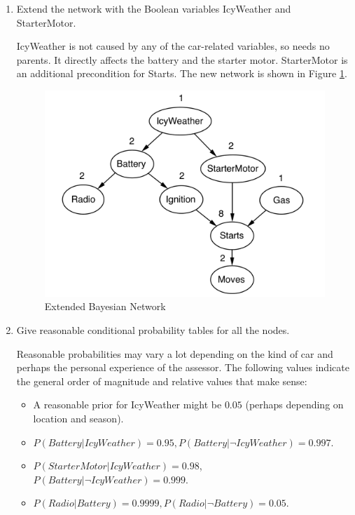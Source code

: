 \documentclass[9pt,a4paper]{extarticle}
\newenvironment{solution}
    {%
    \color{red}
    }
    { 
    \color{black}
    }
\begin{document}
\begin{enumerate}
    \item Extend the network with the Boolean variables IcyWeather and StarterMotor.
    \begin{solution}
    IcyWeather is not caused by any of the car-related variables, so needs no parents. It directly affects the battery and the starter motor. StarterMotor is an additional precondition for Starts. The new network is shown in Figure \ref{fig:ext_car_bnet}.
    \begin{figure}[h]
        \centering
        \includegraphics[width=.9\textwidth]{figures/car_bnet_full.png}
        \caption{Extended Bayesian Network}
        \label{fig:ext_car_bnet}
    \end{figure}
    \end{solution}
    \item Give reasonable conditional probability tables for all the nodes.
    \begin{solution}
    Reasonable probabilities may vary a lot depending on the kind of car and perhaps the personal experience of the assessor. The following values indicate the general order of magnitude and relative values that make sense:
    \begin{itemize}
        \item  A reasonable prior for IcyWeather might be $0.05$ (perhaps depending on location and season).
        \item   $P(Battery|IcyWeather)=0.95,P(Battery|\lnot IcyWeather)=0.997$.
        \item   $P(StarterMotor|IcyWeather) = 0.98$, $P(Battery|\lnot IcyWeather) = 0.999$.
        \item   $P (Radio|Battery) = 0.9999, P (Radio|\lnot Battery) = 0.05$.

\end{itemize}
\end{solution}
\end{enumerate}
\end{document}
